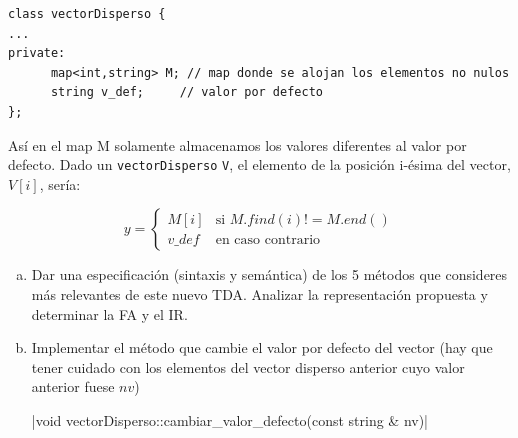\documentclass[10pt,a4paper,spanish]{report}
\begin{document}
\begin{verbatim}
class vectorDisperso {
...
private:
      map<int,string> M; // map donde se alojan los elementos no nulos
      string v_def;     // valor por defecto
};
\end{verbatim}

\noindent
Así en el map M solamente almacenamos los valores diferentes al valor por defecto.
Dado un  \verb*|vectorDisperso| \verb*|V|, el elemento de la posición i-ésima del vector, $V[i]$, sería:

\begin{displaymath}
y = \left\{ \begin{array}{ll}
M[i] & \textrm{si $M.find(i)!=M.end()$}\\
v\_def & \textrm{en caso contrario}
\end{array} \right.
\end{displaymath}

\begin{enumerate}[a)]
      \item Dar una especificación (sintaxis y semántica) de los 5 métodos que consideres más relevantes de este nuevo TDA. Analizar la representación propuesta y determinar la FA y el IR.
      \item Implementar el método que cambie el valor por defecto del vector (hay que tener cuidado con los elementos del vector disperso anterior cuyo valor anterior fuese $nv$)
      \begin{center}
      |void vectorDisperso::cambiar_valor_defecto(const string & nv)|
      \end{center}
\end{enumerate}
\end{document}
